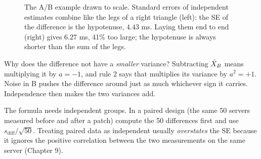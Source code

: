 \begin{figure}[H]
\centering
{}
\caption{The A/B example drawn to scale. Standard errors of independent
estimates combine like the legs of a right triangle (left): the SE of the
difference is the hypotenuse, $4.43$ ms. Laying them end to end (right) gives
$6.27$ ms, 41\% too large; the hypotenuse is always shorter than the sum of the
legs.}
\label{fig:sd-pythag}
\end{figure}

\begin{whybox}
Why does the difference not have a \emph{smaller} variance? Subtracting $\bar{X}_B$
means multiplying it by $a=-1$, and rule 2 says that multiplies its variance by
$a^2=+1$. Noise in B pushes the difference around just as much whichever sign it
carries. Independence then makes the two variances add.
\end{whybox}

\begin{trapbox}
The formula needs independent groups. In a paired design (the same 50 servers
measured before and after a patch) compute the 50 differences first and use
$s_{\text{diff}}/\sqrt{50}$. Treating paired data as independent usually
\emph{overstates} the SE because it ignores the positive correlation between the
two measurements on the same server (Chapter 9).
\end{trapbox}

